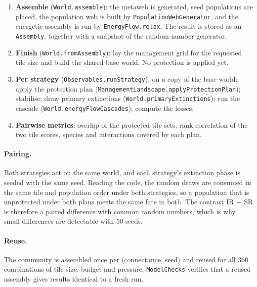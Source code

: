 \documentclass[11pt,a4paper]{article}
\newcommand{\code}[1]{\texttt{\small #1}}
\begin{document}
\begin{enumerate}
\item \textbf{Assemble} (\code{World.assemble}): the metaweb is generated, seed populations are placed,
the population web is built by \code{PopulationWebGenerator}, and the energetic assembly is run by
\code{EnergyFlow.relax}. The result is stored as an \code{Assembly}, together with a snapshot of the
random-number generator.
\item \textbf{Finish} (\code{World.fromAssembly}): lay the management grid for the requested tile size and
build the shared base world. No protection is applied yet.
\item \textbf{Per strategy} (\code{Observables.runStrategy}), on a copy of the base world:
apply the protection plan (\code{ManagementLandscape.applyProtectionPlan}); stabilise; draw primary
extinctions (\code{World.primaryExtinctions}); run the cascade (\code{World.energyFlowCascades});
compute the losses.
\item \textbf{Pairwise metrics}: overlap of the protected tile sets, rank correlation of the two tile
scores, species and interactions covered by each plan.
\end{enumerate}

\paragraph{Pairing.} Both strategies act on the same world, and each strategy's extinction phase is seeded
with the same seed. Reading the code, the random draws are consumed in the same tile and population order
under both strategies, so a population that is unprotected under both plans meets the same fate in both.
The contrast IR $-$ SR is therefore a paired difference with common random numbers, which is why small
differences are detectable with 50 seeds.

\paragraph{Reuse.} The community is assembled once per (connectance, seed) and reused for all 360
combinations of tile size, budget and pressure. \code{ModelChecks} verifies that a reused assembly gives
results identical to a fresh run.
\end{document}
